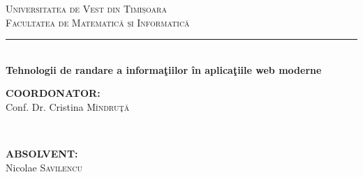\documentclass[12pt, a4paper]{report}
\begin{document}
\begin{titlepage}

	\newcommand{\HRule}{\rule{\linewidth}{0.5mm}} %

	\center %



	\textsc{\LARGE Universitatea de Vest din Timișoara}\\[0.5cm] %
	\textsc{\Large Facultatea de Matematică și Informatică}\\[0.5cm] %



	\HRule \\[0.5cm]
	{\Huge \bf Tehnologii de randare a informa\c tiilor \^ in aplica\c tiile web moderne}\\[6cm] %



	\begin{minipage}{0.4\textwidth}
		\begin{flushleft} \large
			\textbf{COORDONATOR:}\\
			Conf. Dr. Cristina \textsc{M\^ indru\c t\u a} %
		\end{flushleft}
	\end{minipage}
	~
	\begin{minipage}{0.4\textwidth}
		\begin{flushright} \large
			\textbf{ABSOLVENT:} \\
			Nicolae \textsc{Savilencu} %
		\end{flushright}
	\end{minipage}\\[1cm]


\end{titlepage}
\end{document}
